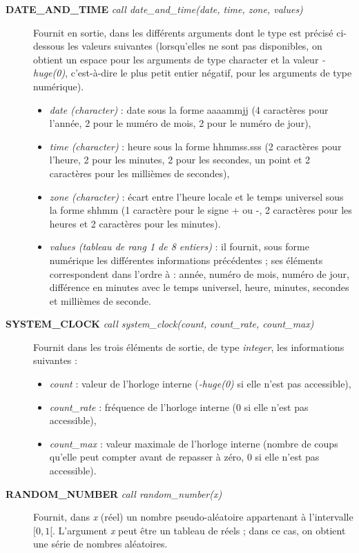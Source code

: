 \documentclass[a4paper,twoside]{article}
\begin{document}
\begin{description}
\item[\textbf{DATE\_AND\_TIME}	\emph{call date\_and\_time(date, time, zone, values)}] Fournit en sortie, dans les dif\-fé\-rents ar\-gu\-ments dont le type est précisé ci-dessous les valeurs suivantes (lorsqu'elles ne sont pas disponibles, on obtient un espace pour les arguments de type character et la valeur \emph{-huge(0)}, c'est-à-dire le plus petit entier négatif, pour les argu\-ments de type numérique). 
\begin{itemize}
\item \emph{date (character)} : date sous la forme aaaammjj (4 caractères pour l'année, 2 pour le numéro de mois, 2 pour le numéro de jour), 
\item \emph{time (character)} : heure sous la forme hhmmss.sss (2 caractères pour l'heure, 2 pour les minutes, 2 pour les secondes, un point et 2 caractères pour les millièmes de secondes),
\item \emph{zone (character)} : écart entre l'heure locale et le temps universel sous la forme shhmm (1 caractère pour le signe + ou -, 2 caractères pour les heures et 2 caractères pour les minutes).
\item \emph{values (tableau de rang 1 de 8 entiers)} : il fournit, sous forme numérique les différentes informations précédentes ; ses éléments correspondent dans l'ordre à : année, numéro de mois, numéro de jour, différence en minutes avec le temps universel, heure, minutes, secondes et millièmes de seconde.
\end{itemize}

\item[\textbf{SYSTEM\_CLOCK} \emph{call system\_clock(count, count\_rate, count\_max)}] Fournit dans les trois élé\-ments de sortie, de type \emph{integer}, les informations suivantes : 
\begin{itemize}
\item \emph{count} : valeur de l'horloge interne (\emph{-huge(0)} si elle n'est pas accessible),
\item \emph{count\_rate} : fréquence de l'horloge interne (0 si elle n'est pas accessible),
\item \emph{count\_max} : valeur maximale de l'horloge interne (nombre de coups qu'elle peut compter avant de repasser à zéro, 0 si elle n'est pas accessible).
\end{itemize}

\item[\textbf{RANDOM\_NUMBER} \emph{call random\_number(x)}] Fournit, dans \emph{x} (réel) un nombre pseu\-do-aléa\-toi\-re appartenant à l'intervalle $[0,1[$. L'argument \emph{x} peut être un tableau de réels ; dans ce cas, on obtient une série de nombres aléatoires.


\end{description}
\end{document}
